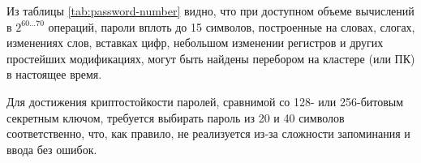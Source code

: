 \documentclass[10pt,a4paper]{book}
\begin{document}
\begin{table}[!ht]
    \centering
    \caption{Различные верхние оценки числа паролей\label{tab:password-number}}
\end{table}

Из таблицы \ref{tab:password-number} видно, что при доступном объеме вычислений в $2^{60 \ldots 70}$ операций, пароли вплоть до 15 символов, построенные на словах, слогах, изменениях слов, вставках цифр, небольшом изменении регистров и других простейших модификациях, могут быть найдены перебором на кластере (или ПК) в настоящее время.

Для достижения криптостойкости паролей, сравнимой со 128- или 256-битовым секретным ключом, требуется выбирать пароль из 20 и 40 символов соответственно, что, как правило, не реализуется из-за сложности запоминания и ввода без ошибок.
\end{document}
